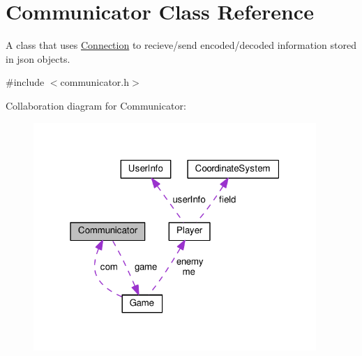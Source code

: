 \hypertarget{classMODEL_1_1Communicator}{}\section{Communicator Class Reference}
\label{classMODEL_1_1Communicator}


A class that uses \hyperlink{classMODEL_1_1Connection}{Connection} to recieve/send encoded/decoded information stored in json objects.  




{\ttfamily \#include $<$communicator.\+h$>$}



Collaboration diagram for Communicator\+:\nopagebreak
\begin{figure}[H]
\begin{center}
\leavevmode
\includegraphics[width=304pt]{classMODEL_1_1Communicator__coll__graph}
\end{center}
\end{figure}
